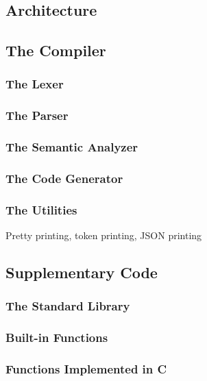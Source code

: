 \begin{homeworkProblem}
	\chapter{Architecture}
	\section{The Compiler}
	\subsection{The Lexer}
	\subsection{The Parser}
	\subsection{The Semantic Analyzer}
	\subsection{The Code Generator}
	\subsection{The Utilities}
	Pretty printing, token printing, JSON printing
	\section{Supplementary Code}
	\subsection{The Standard Library}
	\subsection{Built-in Functions}
	\subsection{Functions Implemented in C}
\end{homeworkProblem}